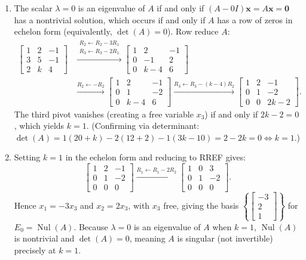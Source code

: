 \documentclass[11pt, letterpaper]{article}
\theoremstyle{definition}
\theoremstyle{remark}
\begin{document}
\begin{enumerate}[label=(\alph*)]
    \item The scalar $\lambda = 0$ is an eigenvalue of $A$ if and only if $(A - 0I)\mathbf{x} = A\mathbf{x} = \mathbf{0}$ has a nontrivial solution, which occurs if and only if $A$ has a row of zeros in echelon form (equivalently, $\det(A) = 0$). Row reduce $A$:
    \begin{align*}
    \begin{bmatrix} 1 & 2 & -1 \\ 3 & 5 & -1 \\ 2 & k & 4 \end{bmatrix}
    &\xrightarrow{\substack{R_2 \leftarrow R_2 - 3R_1 \\ R_3 \leftarrow R_3 - 2R_1}}
    \begin{bmatrix} 1 & 2 & -1 \\ 0 & -1 & 2 \\ 0 & k-4 & 6 \end{bmatrix} \\
    &\xrightarrow{R_2 \leftarrow -R_2}
    \begin{bmatrix} 1 & 2 & -1 \\ 0 & 1 & -2 \\ 0 & k-4 & 6 \end{bmatrix}
    \xrightarrow{R_3 \leftarrow R_3 - (k-4)R_2}
    \begin{bmatrix} 1 & 2 & -1 \\ 0 & 1 & -2 \\ 0 & 0 & 2k - 2 \end{bmatrix}.
    \end{align*}
    The third pivot vanishes (creating a free variable $x_3$) if and only if $2k - 2 = 0$, which yields $k = 1$. (Confirming via determinant: $\det(A) = 1(20+k) - 2(12+2) - 1(3k-10) = 2 - 2k = 0 \iff k = 1$.)

    \item Setting $k = 1$ in the echelon form and reducing to RREF gives:
    \[
    \begin{bmatrix} 1 & 2 & -1 \\ 0 & 1 & -2 \\ 0 & 0 & 0 \end{bmatrix}
    \xrightarrow{R_1 \leftarrow R_1 - 2R_2}
    \begin{bmatrix} 1 & 0 & 3 \\ 0 & 1 & -2 \\ 0 & 0 & 0 \end{bmatrix}.
    \]
    Hence $x_1 = -3x_3$ and $x_2 = 2x_3$, with $x_3$ free, giving the basis $\left\{ \begin{bmatrix} -3 \\ 2 \\ 1 \end{bmatrix} \right\}$ for $E_0 = \operatorname{Nul}(A)$. Because $\lambda = 0$ is an eigenvalue of $A$ when $k = 1$, $\operatorname{Nul}(A)$ is nontrivial and $\det(A) = 0$, meaning $A$ is singular (not invertible) precisely at $k = 1$.
\end{enumerate}
\end{document}
